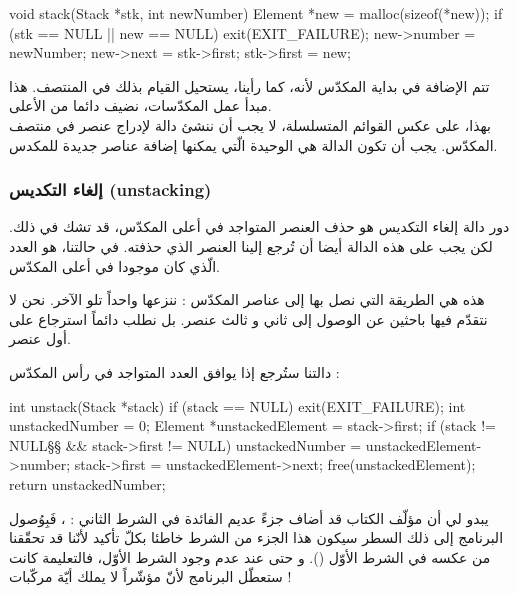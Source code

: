 \begin{Csource}
void stack(Stack *stk, int newNumber)
{
	Element *new = malloc(sizeof(*new));
	if (stk == NULL || new == NULL)
	{
		exit(EXIT_FAILURE);
	}
	new->number = newNumber;
	new->next = stk->first;
	stk->first = new;
}
\end{Csource}

تتم الإضافة في بداية المكدّس لأنه، كما رأينا، يستحيل القيام بذلك في المنتصف. هذا مبدأ عمل المكدّسات، نضيف دائما من الأعلى. \\
بهذا، على عكس القوائم المتسلسلة، لا يجب أن ننشئ دالة لإدراج عنصر في منتصف المكدّس. يجب أن تكون الدالة
هي الوحيدة الّتي يمكنها إضافة عناصر جديدة للمكدس.

\subsubsection{إلغاء التكديس (\textenglish{unstacking})}

دور دالة إلغاء التكديس هو حذف العنصر المتواجد في أعلى المكدّس، قد تشك في ذلك. لكن يجب على هذه الدالة أيضا أن تُرجع إلينا العنصر الذي حذفته. في حالتنا، هو العدد الّذي كان موجودا في أعلى المكدّس.

هذه هي الطريقة التي نصل بها إلى عناصر المكدّس : ننزعها واحداً تلو الآخر. نحن لا نتقدّم فيها باحثين عن الوصول إلى ثاني و ثالث عنصر. بل نطلب دائماً استرجاع على أول عنصر.

دالتنا
ستُرجع إذا
يوافق العدد المتواجد في رأس المكدّس  :

\begin{Csource}
int unstack(Stack *stack)
{
	if (stack == NULL)
	{
		exit(EXIT_FAILURE);
	}
	int unstackedNumber = 0;
	Element *unstackedElement = stack->first;
	if (stack != NULL§\footnotemark§ && stack->first != NULL)
	{
		unstackedNumber = unstackedElement->number;
		stack->first = unstackedElement->next;
		free(unstackedElement);
	}
	return unstackedNumber;
}
\end{Csource}

\begin{tcolorbox}[title=ملاحظة مُرَاجِع الكتاب,colback=orange!20,colframe=orange!70,fontupper=\small,coltitle=white,fonttitle=\small]
يبدو لي أن مؤلّف الكتاب قد أضاف جزءً عديم الفائدة في الشرط الثاني :
،
فَبِوُصول البرنامج إلى ذلك السطر سيكون هذا الجزء من الشرط خاطئا بكلّ تأكيد لأنّنا قد تحقّقنا من عكسه في الشرط الأوّل 
().
و حتى عند عدم وجود الشرط الأوّل، فالتعليمة
كانت ستعطّل البرنامج لأنّ مؤشّراً
لا يملك أيّة مركّبات !
\end{tcolorbox}

